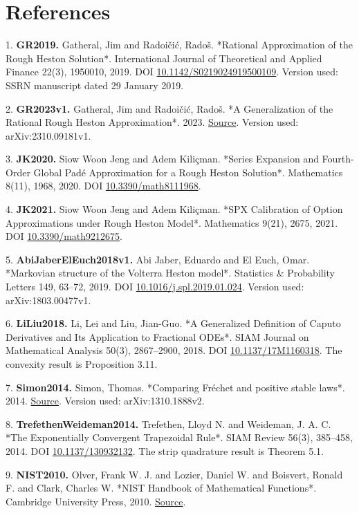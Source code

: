 \documentclass[a4paper,11pt]{article}
\begin{document}
\section*{References}

1. \textbf{GR2019.} Gatheral, Jim and Radoičić, Radoš. *Rational Approximation of the Rough Heston Solution*. International Journal of Theoretical and Applied Finance 22(3), 1950010, 2019. DOI \href{https://doi.org/10.1142/S0219024919500109}{10.1142/S0219024919500109}. Version used: SSRN manuscript dated 29 January 2019.

2. \textbf{GR2023v1.} Gatheral, Jim and Radoičić, Radoš. *A Generalization of the Rational Rough Heston Approximation*. 2023. \href{https://arxiv.org/abs/2310.09181v1}{Source}. Version used: arXiv:2310.09181v1.

3. \textbf{JK2020.} Siow Woon Jeng and Adem Kiliçman. *Series Expansion and Fourth-Order Global Padé Approximation for a Rough Heston Solution*. Mathematics 8(11), 1968, 2020. DOI \href{https://doi.org/10.3390/math8111968}{10.3390/math8111968}.

4. \textbf{JK2021.} Siow Woon Jeng and Adem Kiliçman. *SPX Calibration of Option Approximations under Rough Heston Model*. Mathematics 9(21), 2675, 2021. DOI \href{https://doi.org/10.3390/math9212675}{10.3390/math9212675}.

5. \textbf{AbiJaberElEuch2018v1.} Abi Jaber, Eduardo and El Euch, Omar. *Markovian structure of the Volterra Heston model*. Statistics \& Probability Letters 149, 63–72, 2019. DOI \href{https://doi.org/10.1016/j.spl.2019.01.024}{10.1016/j.spl.2019.01.024}. Version used: arXiv:1803.00477v1.

6. \textbf{LiLiu2018.} Li, Lei and Liu, Jian-Guo. *A Generalized Definition of Caputo Derivatives and Its Application to Fractional ODEs*. SIAM Journal on Mathematical Analysis 50(3), 2867–2900, 2018. DOI \href{https://doi.org/10.1137/17M1160318}{10.1137/17M1160318}. The convexity result is Proposition 3.11.

7. \textbf{Simon2014.} Simon, Thomas. *Comparing Fréchet and positive stable laws*. 2014. \href{https://arxiv.org/abs/1310.1888v2}{Source}. Version used: arXiv:1310.1888v2.

8. \textbf{TrefethenWeideman2014.} Trefethen, Lloyd N. and Weideman, J. A. C. *The Exponentially Convergent Trapezoidal Rule*. SIAM Review 56(3), 385–458, 2014. DOI \href{https://doi.org/10.1137/130932132}{10.1137/130932132}. The strip quadrature result is Theorem 5.1.

9. \textbf{NIST2010.} Olver, Frank W. J. and Lozier, Daniel W. and Boisvert, Ronald F. and Clark, Charles W. *NIST Handbook of Mathematical Functions*. Cambridge University Press, 2010. \href{https://dlmf.nist.gov/}{Source}.
\end{document}
